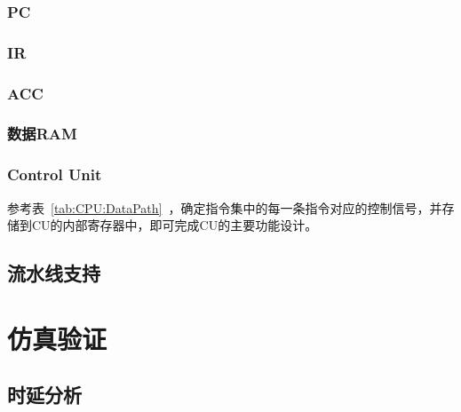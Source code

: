 \documentclass[lang=cn,a4paper,newtx]{elegantpaper}
\begin{document}
\subsubsection{PC}
\subsubsection{IR}
\subsubsection{ACC}
\subsubsection{数据RAM}
\subsubsection{Control Unit}
参考表~\ref{tab:CPU:DataPath}~，确定指令集中的每一条指令对应的控制信号，并存储到CU的内部寄存器中，即可完成CU的主要功能设计。
\subsection{流水线支持}









\section{仿真验证}
\subsection{时延分析}
\end{document}
